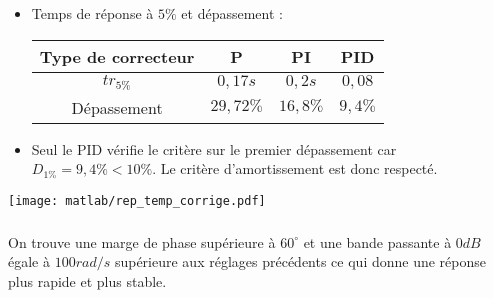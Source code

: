 \begin{multicols}{2}
\begin{itemize}
\item Temps de réponse à $5\%$ et dépassement : 

\begin{tabular}{|c|c|c|c|}
\hline 
Type de correcteur & \textbf{P} & \textbf{PI} & \textbf{PID} \\ 
\hline 
$tr_{5\%}$ & $0,17s$ & $0,2s$ & $0,08$ \\ 
\hline 
Dépassement & $29,72\%$ & $16,8\%$ & $9,4\%$ \\ 
\hline 
\end{tabular} 

\item Seul le PID vérifie le critère sur le premier dépassement car $D_{1\%}=9,4\%<10\%$. Le critère d'amortissement est
donc respecté.
\end{itemize}

\begin{center}
\texttt{[image: matlab/rep\_temp\_corrige.pdf]}
\end{center}

\subparagraph{}\textit{}%

On trouve une marge de phase supérieure à $60^{\circ}$ et une bande passante à $0dB$ égale à $100rad/s$ supérieure aux réglages précédents ce qui donne une réponse plus rapide et plus stable.

\end{multicols}

\else
\fi
%
%
%
%
%
%
%
%
%
%
%
%
